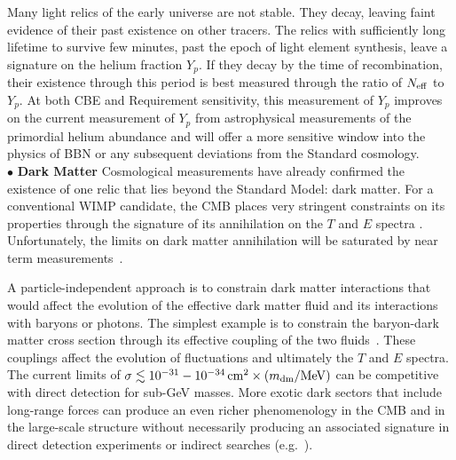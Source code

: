 \documentclass[PICOReport.tex]{subfiles}
\begin{document}
Many light relics of the early universe are not stable. They decay, 
leaving faint evidence of their past existence on other tracers. The relics with sufficiently long lifetime to survive few minutes, 
past the epoch of light element synthesis, leave a signature on the helium fraction $Y_p$.  If they decay 
by the time of recombination, their existence through this period is best measured through the ratio of ${N_{\rm eff}}$ to $Y_p$. At both CBE and Requirement sensitivity, this measurement of $Y_p$ improves on the current measurement of $Y_p$ from astrophysical measurements of the primordial helium abundance and will offer a more sensitive window into the physics of BBN or any subsequent deviations from the Standard cosmology. 
 \\
$\bullet$ {\bf Dark Matter} \hspace{0.1in} Cosmological measurements have already confirmed the existence of one relic that 
lies beyond the Standard Model: dark matter. For a conventional WIMP candidate, the CMB places very stringent 
constraints on its properties through the signature of its annihilation on the $T$ and $E$ 
spectra \citep{Peebles2000, Chen2004, Padmanabhan2005}.  Unfortunately, the limits on dark matter annihilation will be saturated by near term measurements~\citep{Madhavacheril:2013cna,}. 

A particle-independent approach is to constrain dark matter interactions that would 
affect the evolution of the effective dark matter fluid and its interactions with baryons or photons.  The simplest example is 
to constrain the baryon-dark matter cross section through its effective coupling of the two fluids~\cite{Dvorkin:2013cea}.  
These couplings affect the evolution of fluctuations and ultimately the $T$ and $E$ spectra. 
The current limits of $\sigma \lesssim 10^{-31}-10^{-34}\,{\rm cm}^2 \times (m_{\rm dm} / {\rm MeV})$ can be 
competitive with direct detection for sub-GeV masses.  
More exotic dark sectors that include long-range forces can produce an even richer phenomenology in the CMB and in the large-scale structure 
without necessarily producing an associated signature in direct detection experiments or 
indirect searches (e.g.~\cite{Cyr-Racine:2013fsa,Buen-Abad:2015ova,Lesgourgues:2015wza}). 
\end{document}
